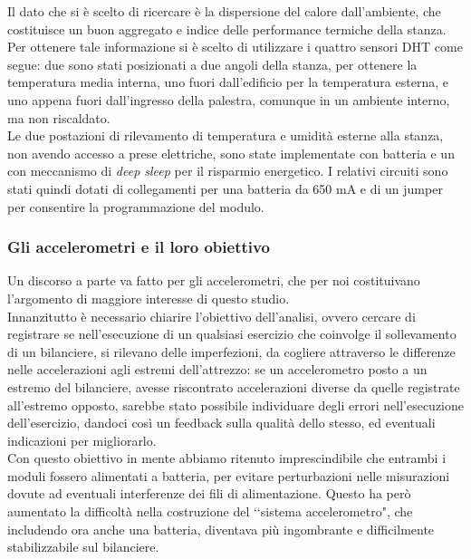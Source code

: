 \documentclass[fleqn,10pt]{SelfArx} %
\begin{document}
Il dato che si è scelto di ricercare è la dispersione del calore dall'ambiente, che costituisce un buon aggregato e 
indice delle performance termiche della stanza.\\
Per ottenere tale informazione si è scelto di utilizzare i quattro sensori DHT come segue: due sono stati 
posizionati a due angoli della stanza, per ottenere la temperatura media interna, uno fuori dall'edificio per la 
temperatura esterna, e uno appena fuori dall'ingresso della palestra, comunque in un ambiente interno, ma non riscaldato.
\\
Le due postazioni di rilevamento di temperatura e umidità esterne alla stanza, non avendo accesso a prese elettriche, 
sono state implementate con batteria e un con meccanismo di \textit{deep sleep} per il risparmio energetico. 
I relativi circuiti sono stati quindi dotati di collegamenti per una batteria da 650 mA e di un jumper per consentire la 
programmazione del modulo.

\subsubsection{Gli accelerometri e il loro obiettivo}

Un discorso a parte va fatto per gli accelerometri, che per noi costituivano l'argomento di maggiore interesse 
di questo studio.\\
Innanzitutto è necessario chiarire l'obiettivo dell'analisi, ovvero cercare di registrare 
se nell'esecuzione di un qualsiasi esercizio che coinvolge il sollevamento di un bilanciere, si rilevano delle 
imperfezioni, da cogliere attraverso le differenze nelle accelerazioni agli estremi dell'attrezzo: se un accelerometro 
posto a un estremo del bilanciere, avesse riscontrato accelerazioni diverse da quelle registrate 
all'estremo opposto, sarebbe stato possibile individuare degli errori nell'esecuzione dell'esercizio, 
dandoci così un feedback sulla qualità dello stesso, ed eventuali indicazioni per migliorarlo.\\

Con questo obiettivo in mente abbiamo ritenuto imprescindibile che entrambi i moduli fossero alimentati a batteria, 
per evitare perturbazioni nelle misurazioni dovute ad eventuali interferenze dei fili di alimentazione. Questo ha però 
aumentato la difficoltà nella costruzione del \lq\lq sistema accelerometro", che includendo ora anche una batteria, 
diventava più ingombrante e difficilmente stabilizzabile sul bilanciere.\\
\end{document}
